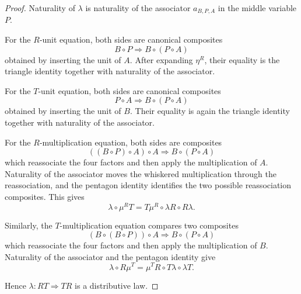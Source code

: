 \begin{proof}
    Naturality of \(\lambda\) is naturality of the associator
    \(a_{B,P,A}\) in the middle variable \(P\).

    For the \(R\)-unit equation, both sides are canonical composites
    \[
        B\circ P
        \Longrightarrow
        B\circ(P\circ A)
    \]
    obtained by inserting the unit of \(A\). After expanding
    \(\eta^R\), their equality is the triangle identity together with
    naturality of the associator.

    For the \(T\)-unit equation, both sides are canonical composites
    \[
        P\circ A
        \Longrightarrow
        B\circ(P\circ A)
    \]
    obtained by inserting the unit of \(B\). Their equality is again the
    triangle identity together with naturality of the associator.

    For the \(R\)-multiplication equation, both sides are composites
    \[
        ((B\circ P)\circ A)\circ A
        \Longrightarrow
        B\circ(P\circ A)
    \]
    which reassociate the four factors and then apply the multiplication of
    \(A\). Naturality of the associator moves the whiskered multiplication
    through the reassociation, and the pentagon identity identifies the two
    possible reassociation composites. This gives
    \[
        \lambda\circ\mu^R T
        =
        T\mu^R\circ\lambda R\circ R\lambda.
    \]

    Similarly, the \(T\)-multiplication equation compares two composites
    \[
        (B\circ(B\circ P))\circ A
        \Longrightarrow
        B\circ(P\circ A)
    \]
    which reassociate the four factors and then apply the multiplication of
    \(B\). Naturality of the associator and the pentagon identity give
    \[
        \lambda\circ R\mu^T
        =
        \mu^T R\circ T\lambda\circ\lambda T.
    \]

    Hence \(\lambda:RT\Rightarrow TR\) is a distributive law.
\end{proof}

